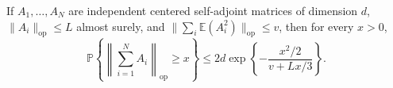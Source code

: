 If \(A_1,\ldots,A_N\) are independent centered self-adjoint matrices of dimension \(d\), \(\|A_i\|_{\mathrm{op}}\le L\) almost surely, and \(\|\sum_i\mathbb E(A_i^2)\|_{\mathrm{op}}\le v\), then for every \(x>0\),
\[
\mathbb P\left\{\left\|\sum_{i=1}^NA_i\right\|_{\mathrm{op}}\ge x\right\}
\le2d\exp\left\{-\frac{x^2/2}{v+Lx/3}\right\}.
\]